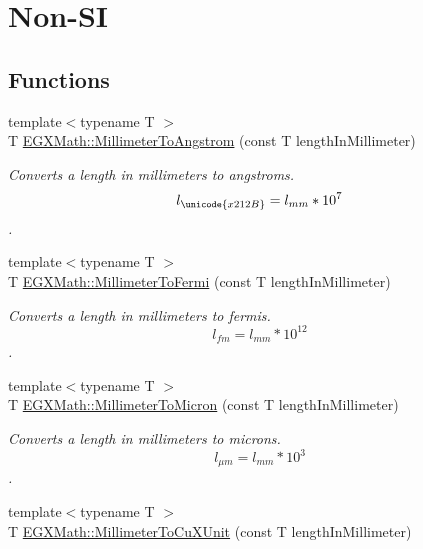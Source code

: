 \hypertarget{group___e_g_x_math-_conversions-_length_conversions-_millimeter-_non-_s_i}{}\section{Non-\/\+SI}
\label{group___e_g_x_math-_conversions-_length_conversions-_millimeter-_non-_s_i}
\subsection*{Functions}
\begin{DoxyCompactItemize}
\item 
{\footnotesize template$<$typename T $>$ }\\T \mbox{\hyperlink{group___e_g_x_math-_conversions-_length_conversions-_millimeter-_non-_s_i_ga40e4659f4689e5be54f8e28fd8ce0008}{E\+G\+X\+Math\+::\+Millimeter\+To\+Angstrom}} (const T length\+In\+Millimeter)
\begin{DoxyCompactList}\small\item\em Converts a length in millimeters to angstroms. \[ l_{\unicode{x212B}}=l_{mm} * 10^{7} \]. \end{DoxyCompactList}\item 
{\footnotesize template$<$typename T $>$ }\\T \mbox{\hyperlink{group___e_g_x_math-_conversions-_length_conversions-_millimeter-_non-_s_i_gaeb57dff8b2e092b5a655ffdd9960897d}{E\+G\+X\+Math\+::\+Millimeter\+To\+Fermi}} (const T length\+In\+Millimeter)
\begin{DoxyCompactList}\small\item\em Converts a length in millimeters to fermis. \[ l_{fm}=l_{mm} * 10^{12} \]. \end{DoxyCompactList}\item 
{\footnotesize template$<$typename T $>$ }\\T \mbox{\hyperlink{group___e_g_x_math-_conversions-_length_conversions-_millimeter-_non-_s_i_ga47eac74d2eeec20afc801e61d53f67a0}{E\+G\+X\+Math\+::\+Millimeter\+To\+Micron}} (const T length\+In\+Millimeter)
\begin{DoxyCompactList}\small\item\em Converts a length in millimeters to microns. \[ l_{\mu m}=l_{mm} * 10^{3} \]. \end{DoxyCompactList}\item 
{\footnotesize template$<$typename T $>$ }\\T \mbox{\hyperlink{group___e_g_x_math-_conversions-_length_conversions-_millimeter-_non-_s_i_gaa9a94e1f42047955530f673047c4370b}{E\+G\+X\+Math\+::\+Millimeter\+To\+Cu\+X\+Unit}} (const T length\+In\+Millimeter)

\end{DoxyCompactItemize}
